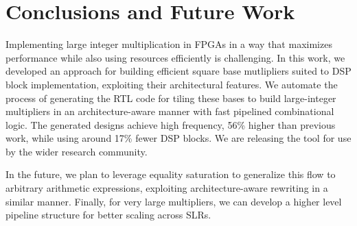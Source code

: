 \documentclass[conference]{IEEEtran}
\begin{document}
\section{Conclusions and Future Work}
Implementing large integer multiplication in FPGAs in a way that maximizes performance while also using resources efficiently is challenging.  
In this work, we developed an approach for building efficient square base mutlipliers suited to DSP block implementation, exploiting their architectural features. 
We automate the process of generating the RTL code for tiling these bases to build large-integer multipliers in an architecture-aware manner with fast pipelined combinational logic.
The generated designs achieve high frequency, 56\% higher than previous work, while using around 17\% fewer DSP blocks.
We are releasing the tool for use by the wider research community.

In the future, we plan to leverage equality saturation to generalize this flow to arbitrary arithmetic expressions, exploiting architecture-aware rewriting in a similar manner.
Finally, for very large multipliers, we can develop a higher level pipeline structure for better scaling across SLRs.






\end{document}
